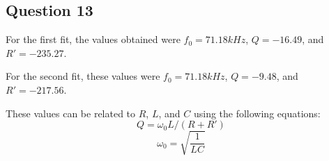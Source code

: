 \documentclass[a4paper]{article}
\begin{document}
\subsection{Question 13}

For the first fit, the values obtained were $f_0=71.18kHz$, $Q=-16.49$, and $R'=-235.27$. 

For the second fit, these values were $f_0=71.18kHz$, $Q=-9.48$, and $R'=-217.56$.

These values can be related to $R$, $L$, and $C$ using the following equations:
\begin{equation}
Q=\omega_0L/(R+R')
\end{equation}
\begin{equation}
\omega_0=\sqrt{\frac1{LC}}
\end{equation}
\end{document}
